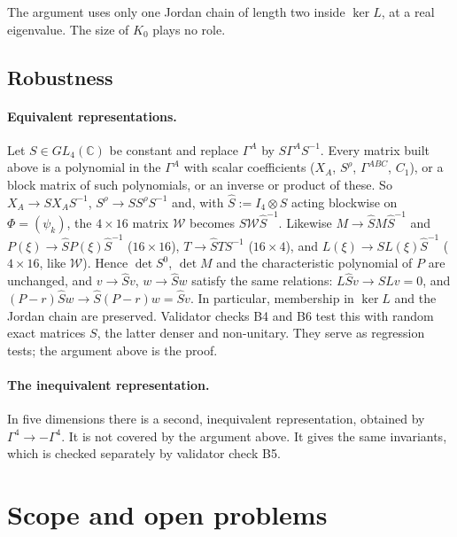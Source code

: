 \documentclass[11pt]{article}
\theoremstyle{plain}
\theoremstyle{definition}
\theoremstyle{remark}
\newcommand{\C}{\mathbb{C}}
\newcommand{\Wcal}{\mathcal{W}}
\begin{document}
The argument uses only one Jordan chain of length two inside $\ker L$, at a real eigenvalue. The size of $K_0$ plays no role.

\subsection{Robustness}\label{sec:robust}

\paragraph{Equivalent representations.} Let $S \in GL_4(\C)$ be constant and replace $\Gamma^A$ by $S\Gamma^AS^{-1}$. Every matrix built above is a polynomial in the $\Gamma^A$ with scalar coefficients ($X_A$, $S^\rho$, $\Gamma^{ABC}$, $C_1$), or a block matrix of such polynomials, or an inverse or product of these. So $X_A \to SX_AS^{-1}$, $S^\rho \to SS^\rho S^{-1}$ and, with $\hat S := I_4\otimes S$ acting blockwise on $\Phi = (\psi_k)$, the $4\times16$ matrix $\Wcal$ becomes $S\Wcal\hat S^{-1}$. Likewise $M \to \hat SM\hat S^{-1}$ and $P(\xi) \to \hat SP(\xi)\hat S^{-1}$ ($16\times16$), $T \to \hat STS^{-1}$ ($16\times4$), and $L(\xi) \to SL(\xi)\hat S^{-1}$ ($4\times16$, like $\Wcal$). Hence $\det S^0$, $\det M$ and the characteristic polynomial of $P$ are unchanged, and $v \to \hat Sv$, $w \to \hat Sw$ satisfy the same relations: $L\hat Sv \to SLv = 0$, and $(P - r)\hat Sw \to \hat S(P - r)w = \hat Sv$. In particular, membership in $\ker L$ and the Jordan chain are preserved. Validator checks B4 and B6 test this with random exact matrices $S$, the latter denser and non-unitary. They serve as regression tests; the argument above is the proof.

\paragraph{The inequivalent representation.} In five dimensions there is a second, inequivalent representation, obtained by $\Gamma^4 \to -\Gamma^4$. It is not covered by the argument above. It gives the same invariants, which is checked separately by validator check B5.

\section{Scope and open problems}\label{sec:scope}
\end{document}
